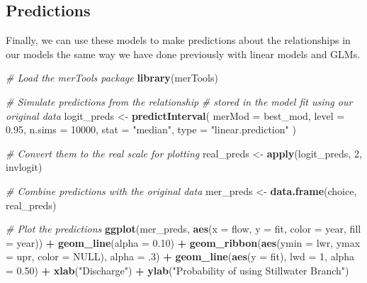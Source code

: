 \documentclass[
]{book}
\newenvironment{Shaded}{\begin{snugshade}}{\end{snugshade}}
\newcommand{\CommentTok}[1]{\textcolor[rgb]{0.56,0.35,0.01}{\textit{#1}}}
\newcommand{\DataTypeTok}[1]{\textcolor[rgb]{0.13,0.29,0.53}{#1}}
\newcommand{\DecValTok}[1]{\textcolor[rgb]{0.00,0.00,0.81}{#1}}
\newcommand{\FloatTok}[1]{\textcolor[rgb]{0.00,0.00,0.81}{#1}}
\newcommand{\KeywordTok}[1]{\textcolor[rgb]{0.13,0.29,0.53}{\textbf{#1}}}
\newcommand{\NormalTok}[1]{#1}
\newcommand{\OperatorTok}[1]{\textcolor[rgb]{0.81,0.36,0.00}{\textbf{#1}}}
\newcommand{\OtherTok}[1]{\textcolor[rgb]{0.56,0.35,0.01}{#1}}
\newcommand{\StringTok}[1]{\textcolor[rgb]{0.31,0.60,0.02}{#1}}
\begin{document}
\hypertarget{glmm-logistic-preds}{%
\subsection{Predictions}\label{glmm-logistic-preds}}

Finally, we can use these models to make predictions about the relationships in our models the same way we have done previously with linear models and GLMs.

\begin{Shaded}
\begin{Highlighting}[]
\CommentTok{# Load the merTools package}
\KeywordTok{library}\NormalTok{(merTools)}

\CommentTok{# Simulate predictions from the relationship}
\CommentTok{# stored in the model fit using our original data}
\NormalTok{logit_preds <-}\StringTok{ }\KeywordTok{predictInterval}\NormalTok{(}
  \DataTypeTok{merMod =}\NormalTok{ best_mod,}
  \DataTypeTok{level =} \FloatTok{0.95}\NormalTok{, }\DataTypeTok{n.sims =} \DecValTok{10000}\NormalTok{,}
  \DataTypeTok{stat =} \StringTok{"median"}\NormalTok{, }\DataTypeTok{type =} \StringTok{"linear.prediction"}
\NormalTok{)}

\CommentTok{# Convert them to the real scale for plotting}
\NormalTok{real_preds <-}\StringTok{ }\KeywordTok{apply}\NormalTok{(logit_preds, }\DecValTok{2}\NormalTok{, invlogit)}

\CommentTok{# Combine predictions with the original data}
\NormalTok{mer_preds <-}\StringTok{ }\KeywordTok{data.frame}\NormalTok{(choice, real_preds)}

\CommentTok{# Plot the predictions}
\KeywordTok{ggplot}\NormalTok{(mer_preds, }\KeywordTok{aes}\NormalTok{(}\DataTypeTok{x =}\NormalTok{ flow, }\DataTypeTok{y =}\NormalTok{ fit, }\DataTypeTok{color =}\NormalTok{ year, }\DataTypeTok{fill =}\NormalTok{ year)) }\OperatorTok{+}
\StringTok{  }\KeywordTok{geom_line}\NormalTok{(}\DataTypeTok{alpha =} \FloatTok{0.10}\NormalTok{) }\OperatorTok{+}
\StringTok{  }\KeywordTok{geom_ribbon}\NormalTok{(}\KeywordTok{aes}\NormalTok{(}\DataTypeTok{ymin =}\NormalTok{ lwr, }\DataTypeTok{ymax =}\NormalTok{ upr, }\DataTypeTok{color =} \OtherTok{NULL}\NormalTok{), }\DataTypeTok{alpha =} \FloatTok{.3}\NormalTok{) }\OperatorTok{+}
\StringTok{  }\KeywordTok{geom_line}\NormalTok{(}\KeywordTok{aes}\NormalTok{(}\DataTypeTok{y =}\NormalTok{ fit), }\DataTypeTok{lwd =} \DecValTok{1}\NormalTok{, }\DataTypeTok{alpha =} \FloatTok{0.50}\NormalTok{) }\OperatorTok{+}
\StringTok{  }\KeywordTok{xlab}\NormalTok{(}\StringTok{"Discharge"}\NormalTok{) }\OperatorTok{+}
\StringTok{  }\KeywordTok{ylab}\NormalTok{(}\StringTok{"Probability of using Stillwater Branch"}\NormalTok{)}
\end{Highlighting}
\end{Shaded}
\end{document}
